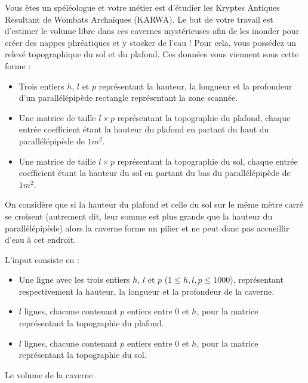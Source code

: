 \problemname{}


Vous êtes un spéléologue et votre métier est d'étudier les Kryptes Antiques Resultant de Wombats Archaïques (KARWA). Le but de votre travail est d'estimer le volume libre dans ces cavernes mystérieuses afin de les inonder pour créer des nappes phréatiques et y stocker de l'eau ! Pour cela, vous possédez un relevé topographique du sol et du plafond. Ces données vous viennent sous cette forme :
\begin{itemize}
\item Trois entiers $h$, $l$ et $p$ représentant la hauteur, la longueur et la profondeur d'un parallélépipède rectangle représentant la zone scannée.
\item Une matrice de taille $l\times p$ représentant la topographie du plafond, chaque entrée coefficient étant la hauteur du plafond en partant du haut du parallélépipède de $1m^2$.
\item Une matrice de taille $l\times p$ représentant la topographie du sol, chaque entrée coefficient étant la hauteur du sol en partant du bas du parallélépipède de $1m^2$.
\end{itemize}

On considère que si la hauteur du plafond et celle du sol sur le même mètre carré se croisent (autrement dit, leur somme est plus grande que la hauteur du parallélépipède) alors la caverne forme un pilier et ne peut donc pas accueillir d'eau à cet endroit.

\begin{Input}
    L'input consiste en :
    \begin{itemize}
        \item Une ligne avec les trois entiers $h$, $l$ et $p$ ($1 \leq h, l, p \leq 1000$), représentant respectivement la hauteur, la longueur et la profondeur de la caverne.
        \item $l$ lignes, chacune contenant $p$ entiers entre $0$ et $h$, pour la matrice représentant la topographie du plafond.
        \item $l$ lignes, chacune contenant $p$ entiers entre $0$ et $h$, pour la matrice représentant la topographie du sol.
    \end{itemize}
\end{Input}

\begin{Output}
    Le volume de la caverne.
\end{Output}
